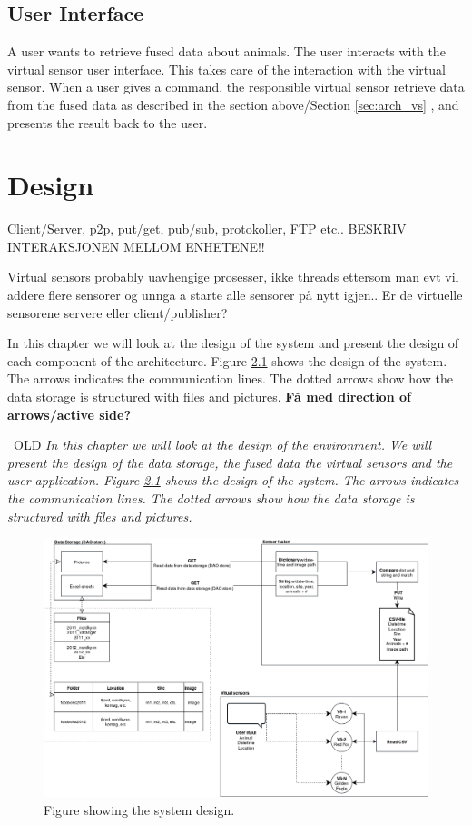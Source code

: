 \documentclass[USenglish]{uit-thesis}
\begin{document}
\section{User Interface} \label{sec:arch_user_int}
A user wants to retrieve fused data about animals. The user interacts with the virtual sensor user interface. This takes care of the interaction with the virtual sensor. When a user gives a command, the responsible virtual sensor retrieve data from the fused data as described in the section above/Section \ref{sec:arch_vs} , and presents the result back to the user.



\chapter{Design}
Client/Server, p2p, put/get, pub/sub, protokoller, FTP etc..
BESKRIV INTERAKSJONEN MELLOM ENHETENE!!

Virtual sensors probably uavhengige prosesser, ikke threads ettersom man evt vil addere flere sensorer og unnga a starte alle sensorer på nytt igjen..
Er de virtuelle sensorene servere eller client/publisher?

In this chapter we will look at the design of the system and present the design of each component of the architecture. Figure \ref{fig:design} shows the design of the system. The arrows indicates the communication lines. The dotted arrows show how the data storage is structured with files and pictures. \textbf{Få med direction of arrows/active side?}

\ OLD
\textit{In this chapter we will look at the design of the environment. We will present the design of the data storage, the fused data the virtual sensors and the user application. Figure \ref{fig:design} shows the design of the system. The arrows indicates the communication lines. The dotted arrows show how the data storage is structured with files and pictures.}


\begin{figure}
\centering
\includegraphics[width=\textwidth]{Design.png}
\caption{Figure showing the system design.}
\label{fig:design}
\end{figure}
\end{document}
